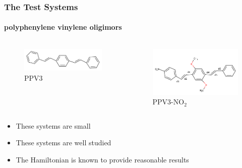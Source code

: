 \documentclass{beamer}
\begin{document}
\begin{frame}
  \frametitle{The Test Systems}
  \framesubtitle{polyphenylene vinylene oligimors}
\begin{columns}[b]
 \begin{figure}
  \includegraphics[width=\textwidth]{Images/ppv3.png}
  \caption{PPV3}
 \end{figure}
 \begin{figure}
  \includegraphics[width=\textwidth]{Images/ppvno2.png}
  \caption{PPV3-NO$_2$}
 \end{figure}
\end{columns}
\begin{block}{}
  \begin{itemize}
    \item These systems are small
    \item These systems are well studied
    \item The Hamiltonian is known to provide reasonable results
  \end{itemize}
\end{block}
\end{frame}
\end{document}
